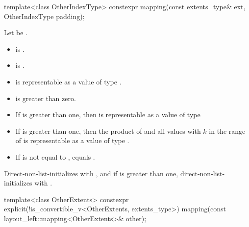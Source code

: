 %
\begin{itemdecl}
template<class OtherIndexType>
  constexpr mapping(const extents_type& ext, OtherIndexType padding);
\end{itemdecl}

\begin{itemdescr}
\pnum
Let  be
.

\pnum
\constraints
\begin{itemize}
\item
{} is .
\item
{} is .
\end{itemize}

\pnum
\expects
\begin{itemize}
\item
{} is representable as a value of type .
\item
{} is greater than zero.
\item
If  is greater than one,
then 
is representable as a value of type 
\item
If  is greater than one,
then the product of
 and
all values 
with $k$ in the range of 
is representable as a value of type .
\item
If  is not equal to ,
 equals .
\end{itemize}

\pnum
\effects
Direct-non-list-initializes  with , and
if  is greater than one,
direct-non-list-initializes  with
.
\end{itemdescr}

%
\begin{itemdecl}
template<class OtherExtents>
  constexpr explicit(!is_convertible_v<OtherExtents, extents_type>)
    mapping(const layout_left::mapping<OtherExtents>& other);
\end{itemdecl}

